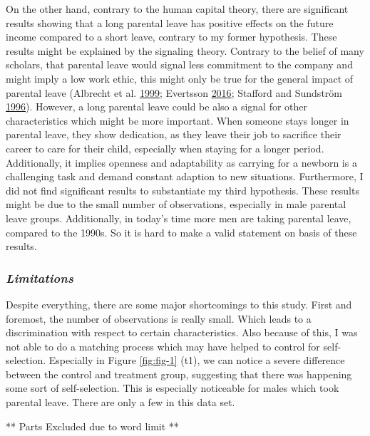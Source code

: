 \documentclass[
  11pt,
]{article}
\begin{document}
On the other hand, contrary to the human capital theory, there are significant results showing that a long parental leave has positive effects on the future income compared to a short leave, contrary to my former hypothesis.
These results might be explained by the signaling theory. Contrary to the belief of many scholars, that parental leave would signal less commitment to the company and might imply a low work ethic, this might only be true for the general impact of parental leave (Albrecht et al. \protect\hyperlink{ref-albrecht_career_1999}{1999}; Evertsson \protect\hyperlink{ref-evertsson_parental_2016}{2016}; Stafford and Sundström \protect\hyperlink{ref-stafford_time_1996}{1996}). However, a long parental leave could be also a signal for other characteristics which might be more important. When someone stays longer in parental leave, they show dedication, as they leave their job to sacrifice their career to care for their child, especially when staying for a longer period. Additionally, it implies openness and adaptability as carrying for a newborn is a challenging task and demand constant adaption to new situations.
Furthermore, I did not find significant results to substantiate my third hypothesis. These results might be due to the small number of observations, especially in male parental leave groups. Additionally, in today's time more men are taking parental leave, compared to the 1990s. So it is hard to make a valid statement on basis of these results.

\hypertarget{limitations}{%
\subsubsection*{\texorpdfstring{\emph{Limitations}}{Limitations}}\label{limitations}}

Despite everything, there are some major shortcomings to this study. First and foremost, the number of observations is really small.
Which leads to a discrimination with respect to certain characteristics. Also because of this, I was not able to do a matching process which may have helped to control for self-selection. Especially in Figure \ref{fig:fig-1} (t1), we can notice a severe difference between the control and treatment group, suggesting that there was happening some sort of self-selection. This is especially noticeable for males which took parental leave. There are only a few in this data set.

** Parts Excluded due to word limit **
\end{document}
